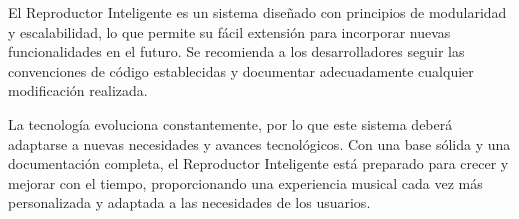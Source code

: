 \documentclass[a4paper,12pt]{article}
\begin{document}
El Reproductor Inteligente es un sistema diseñado con principios de modularidad y escalabilidad, lo que permite su fácil extensión para incorporar nuevas funcionalidades en el futuro. Se recomienda a los desarrolladores seguir las convenciones de código establecidas y documentar adecuadamente cualquier modificación realizada.

La tecnología evoluciona constantemente, por lo que este sistema deberá adaptarse a nuevas necesidades y avances tecnológicos. Con una base sólida y una documentación completa, el Reproductor Inteligente está preparado para crecer y mejorar con el tiempo, proporcionando una experiencia musical cada vez más personalizada y adaptada a las necesidades de los usuarios.
\end{document}
